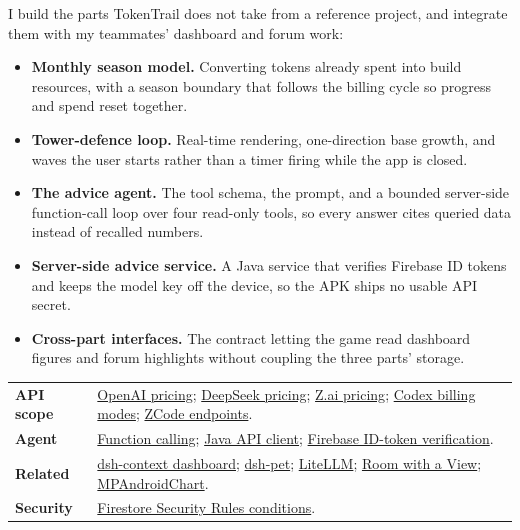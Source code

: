 \documentclass[10pt,a4paper]{article}
\newcommand{\sect}[1]{\vspace{3pt}{\large\bfseries#1}\par\vspace{1pt}}
\begin{document}
\sect{12. Your key contributions and improvements}
I build the parts TokenTrail does not take from a reference project, and integrate them with my teammates' dashboard and forum work:
\begin{itemize}
\item \textbf{Monthly season model.} Converting tokens already spent into build resources, with a season boundary that follows the billing cycle so progress and spend reset together.
\item \textbf{Tower-defence loop.} Real-time rendering, one-direction base growth, and waves the user starts rather than a timer firing while the app is closed.
\item \textbf{The advice agent.} The tool schema, the prompt, and a bounded server-side function-call loop over four read-only tools, so every answer cites queried data instead of recalled numbers.
\item \textbf{Server-side advice service.} A Java service that verifies Firebase ID tokens and keeps the model key off the device, so the APK ships no usable API secret.
\item \textbf{Cross-part interfaces.} The contract letting the game read dashboard figures and forum highlights without coupling the three parts' storage.
\end{itemize}

\sect{13. Sources and project references}
\begin{tabularx}{\linewidth}{@{}>{\raggedright\arraybackslash}p{25mm}Y@{}}
\textbf{API scope} & \href{https://developers.openai.com/api/docs/pricing}{OpenAI pricing}; \href{https://api-docs.deepseek.com/quick_start/pricing/}{DeepSeek pricing}; \href{https://docs.z.ai/guides/overview/pricing}{Z.ai pricing}; \href{https://learn.chatgpt.com/docs/auth}{Codex billing modes}; \href{https://zcode.z.ai/en/docs/configuration}{ZCode endpoints}.\\
\textbf{Agent} & \href{https://developers.openai.com/api/docs/guides/function-calling}{Function calling}; \href{https://developers.openai.com/api/docs/libraries}{Java API client}; \href{https://firebase.google.com/docs/auth/admin/verify-id-tokens}{Firebase ID-token verification}.\\
\textbf{Related} & \href{https://github.com/bowenliang123/dsh-context/blob/main/README.md}{dsh-context dashboard}; \href{https://github.com/zhu1090093659/dsh-pet/blob/main/README.zh.md}{dsh-pet}; \href{https://docs.litellm.ai/docs/simple_proxy}{LiteLLM}; \href{https://github.com/android/codelab-android-room-with-a-view}{Room with a View}; \href{https://github.com/PhilJay/MPAndroidChart}{MPAndroidChart}.\\
\textbf{Security} & \href{https://firebase.google.com/docs/firestore/security/rules-conditions}{Firestore Security Rules conditions}.\\
\end{tabularx}
\end{document}
